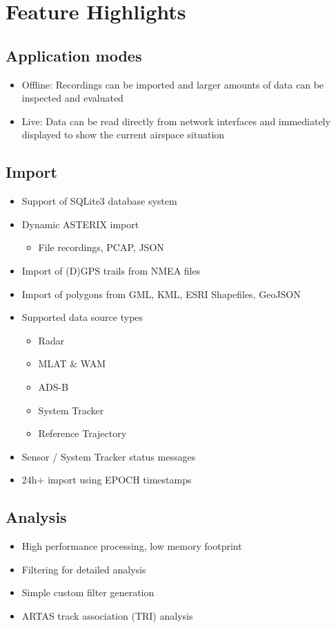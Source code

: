 \section{Feature Highlights}

\subsection{Application modes}
\begin{itemize} 
    \item Offline: Recordings can be imported and larger amounts of data can be inspected and evaluated
    \item Live: Data can be read directly from network interfaces and immediately displayed to show the current airspace situation
\end{itemize}

\subsection{Import}
\begin{itemize}  
    \item Support of SQLite3 database system
    \item Dynamic ASTERIX import
    \begin{itemize}  
        \item File recordings, PCAP, JSON
    \end{itemize}    
    \item Import of (D)GPS trails from NMEA files
    \item Import of polygons from GML, KML, ESRI Shapefiles, GeoJSON
    \item Supported data source types
    \begin{itemize}  
        \item Radar
        \item MLAT \& WAM
        \item ADS-B
        \item System Tracker
        \item Reference Trajectory
    \end{itemize}
    \item Sensor / System Tracker status messages
    \item 24h+ import using EPOCH timestamps    
\end{itemize}

\subsection{Analysis}
\begin{itemize}  
    \item High performance processing, low memory footprint
    \item Filtering for detailed analysis
    \item Simple custom filter generation
    \item ARTAS track association (TRI) analysis
\end{itemize}

